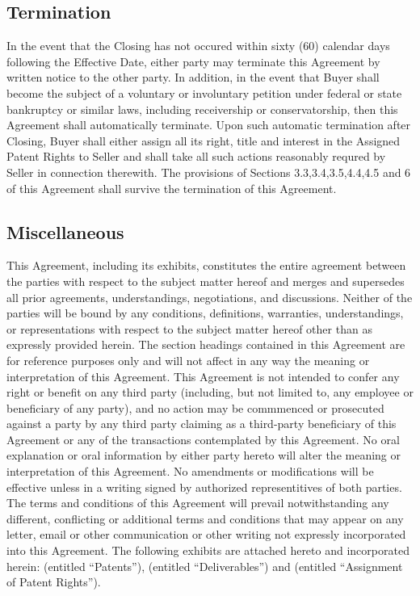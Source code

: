 \documentclass[letterpaper,10pt,english]{sphinxmanual}
\begin{document}
\subsection{Termination}
\label{\detokenize{7-miscellaneous:termination}}
In the event that the Closing has not occured within sixty (60) calendar days following the Effective Date, either party may terminate this Agreement by written notice to the other party. In addition, in the event that Buyer shall become the subject of a voluntary or involuntary petition under federal or state bankruptcy or similar laws, including receivership or conservatorship, then this Agreement shall automatically terminate. Upon such automatic termination after Closing, Buyer shall either assign all its right, title and interest in the Assigned Patent Rights to Seller and shall take all such actions reasonably requred by Seller in connection therewith. The provisions of Sections 3.3,3.4,3.5,4.4,4.5 and 6 of this Agreement shall survive the termination of this Agreement.


\subsection{Miscellaneous}
\label{\detokenize{7-miscellaneous:id1}}
This Agreement, including its exhibits, constitutes the entire agreement between the parties with respect to the subject matter hereof and merges and supersedes all prior agreements, understandings, negotiations, and discussions. Neither of the parties will be bound by any conditions, definitions, warranties, understandings, or representations with respect to the subject matter hereof other than as expressly provided herein. The section headings contained in this Agreement are for reference purposes only and will not affect in any way the meaning or interpretation of this Agreement. This Agreement is not intended to confer any right or benefit on any third party (including, but not limited to, any employee or beneficiary of any party), and no action may be commmenced or prosecuted against a party by any third party claiming as a third-party beneficiary of this Agreement or any of the transactions contemplated by this Agreement. No oral explanation or oral information by either party hereto will alter the meaning or interpretation of this Agreement. No amendments or modifications will be effective unless in a writing signed by authorized representitives of both parties. The terms and conditions of this Agreement will prevail notwithstanding any different, conflicting or additional terms and conditions that may appear on any letter, email or other communication or other writing not expressly incorporated into this Agreement. The following exhibits are attached hereto and incorporated herein:  (entitled “Patents”),  (entitled “Deliverables”) and  (entitled “Assignment of Patent Rights”).
\end{document}
